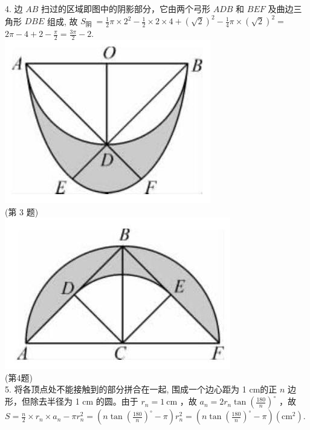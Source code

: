 \documentclass[10pt]{article}
\begin{document}
4. 边 $A B$ 扫过的区域即图中的阴影部分，它由两个弓形 $A D B$ 和 $B E F$ 及曲边三角形 $D B E$ 组成, 故 $S_{\text {阴 }}=\frac{1}{2} \pi \times 2^{2}-\frac{1}{2} \times 2 \times 4+(\sqrt{2})^{2}-\frac{1}{4} \pi \times(\sqrt{2})^{2}=$ $2 \pi-4+2-\frac{\pi}{2}=\frac{3 \pi}{2}-2$.\\
\includegraphics[max width=\textwidth, center]{2024_10_30_66b8e5e701da2093c133g-085(2)}\\
(第 3 题)\\
\includegraphics[max width=\textwidth, center]{2024_10_30_66b8e5e701da2093c133g-085}\\
(第4题)\\
5. 将各顶点处不能接触到的部分拼合在一起, 围成一个边心距为 1 cm的正 $n$ 边形，但除去半径为 1 cm 的圆。由于 $r_{n}=1 \mathrm{~cm}$ ，故 $a_{n}=2 r_{n} \tan \left(\frac{180}{n}\right)^{\circ}$ ，故 $S=\frac{n}{2} \times r_{n} \times a_{n}-\pi r_{n}^{2}=\left(n \tan \left(\frac{180}{n}\right)^{\circ}-\pi\right) r_{n}^{2}=\left(n \tan \left(\frac{180}{n}\right)^{\circ}-\pi\right)\left(\mathrm{cm}^{2}\right)$.\\
\end{document}
